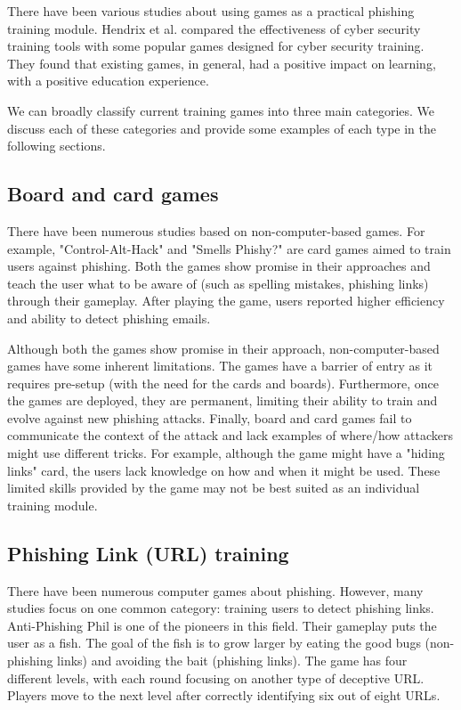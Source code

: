 There have been various studies about using games as a practical phishing training module. Hendrix et al. \cite{hendrix_al_sherbaz_bloom_2016} compared the effectiveness of cyber security training tools with some popular games designed for cyber security training. They found that existing games, in general, had a positive impact on learning, with a positive education experience.

We can broadly classify current training games into three main categories. We discuss each of these categories and provide some examples of each type in the following sections.

\subsection{Board and card games}
There have been numerous studies based on non-computer-based games. For example, "Control-Alt-Hack" \cite{control_alt_hack} and "Smells Phishy?" \cite{smels_phishy} are card games aimed to train users against phishing. Both the games show promise in their approaches and teach the user what to be aware of (such as spelling mistakes, phishing links) through their gameplay. After playing the game, users reported higher efficiency and ability to detect phishing emails.

Although both the games show promise in their approach, non-computer-based games have some inherent limitations. The games have a barrier of entry as it requires pre-setup (with the need for the cards and boards). Furthermore, once the games are deployed, they are permanent, limiting their ability to train and evolve against new phishing attacks. Finally, board and card games fail to communicate the context of the attack and lack examples of where/how attackers might use different tricks. For example, although the game might have a "hiding links" card, the users lack knowledge on how and when it might be used. These limited skills provided by the game may not be best suited as an individual training module.

\subsection{Phishing Link (URL) training}
There have been numerous computer games about phishing. However, many studies focus on one common category: training users to detect phishing links. Anti-Phishing Phil \cite{anti_phishing_phil} is one of the pioneers in this field. Their gameplay puts the user as a fish. The goal of the fish is to grow larger by eating the good bugs (non-phishing links) and avoiding the bait (phishing links). The game has four different levels, with each round focusing on another type of deceptive URL. Players move to the next level after correctly identifying six out of eight URLs.


